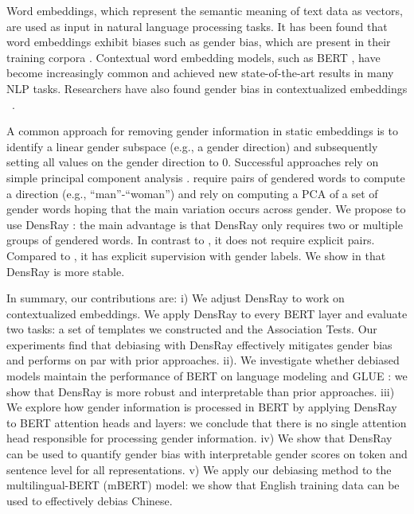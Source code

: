 Word embeddings, which represent the semantic meaning of
text data as vectors, are used as input in natural language
processing tasks. It has been found that word embeddings
exhibit biases such as gender bias, which are present in their training
corpora \cite{bolukbasi2016man,caliskan2017semantics,garg2018word}. Contextual word
embedding models, such as BERT \cite{devlin2018bert}, have
become increasingly common and achieved new state-of-the-art
results in many NLP tasks. Researchers have also found
gender bias in contextualized
embeddings ~\cite{zhao2019gender,may2019measuring}.

A common approach for removing gender information in static
embeddings is to identify a linear gender subspace (e.g., a
gender direction) and subsequently setting all values on the
gender direction to 0. Successful approaches rely on simple
principal component
analysis \cite{bolukbasi2016man,mu2018all}. \cite{bolukbasi2016man}
require pairs of gendered words to compute a direction
(e.g., ``man''-``woman'') and \cite{mu2018all} rely on
computing a PCA of a set of gender words hoping that the
main variation occurs across gender. We propose to use
DensRay \cite{dufter2019analytical}: the main advantage is
that DensRay only requires two or multiple groups of
gendered words. In contrast to \cite{bolukbasi2016man}, it
does not require explicit pairs. Compared
to \cite{mu2018all}, it has explicit supervision with gender
labels. We show in  that
DensRay is more stable.

In summary, our contributions are: 
i) We adjust DensRay to work on contextualized embeddings.  We apply DensRay to every BERT layer and evaluate two tasks: a set of templates we constructed and the Association Tests. Our experiments find that debiasing with DensRay effectively mitigates gender bias and performs on par with prior approaches. 
ii). We investigate whether debiased models maintain the performance of BERT on language modeling and GLUE \cite{wang2018glue}: we show that DensRay is more robust and interpretable than prior approaches.
iii) We explore how gender information is processed in BERT by applying DensRay to BERT attention heads and layers: we conclude that there is no single attention head responsible for processing gender information.
iv) We show that DensRay can be used to quantify gender bias with interpretable gender scores on token and sentence level for all representations. 
v) We apply our debiasing method to the multilingual-BERT (mBERT) model: we show that English training data can be used to effectively debias Chinese.

